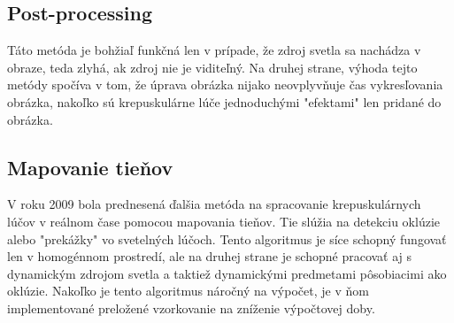 \documentclass[10pt,twoside,slovak,a4paper]{article}
\begin{document}
\subsection{Post-processing} \label{spracovanie:pp}
Táto metóda je bohžiaľ funkčná len v prípade, že zdroj svetla sa nachádza v obraze, 
teda zlyhá, ak zdroj nie je viditeľný. Na druhej strane, výhoda tejto metódy spočíva v 
tom, že úprava obrázka nijako neovplyvňuje čas vykresľovania obrázka, nakoľko sú 
krepuskulárne lúče jednoduchými "efektami" len pridané do obrázka.

\subsection{Mapovanie tieňov} \label{spracovanie:mt}
V roku 2009 bola prednesená ďalšia metóda na spracovanie krepuskulárnych lúčov v reálnom 
čase pomocou mapovania tieňov. Tie slúžia na detekciu oklúzie alebo "prekážky" vo svetelných 
lúčoch. Tento algoritmus je síce schopný fungovať len v homogénnom prostredí, ale na druhej 
strane je schopné pracovať aj s dynamickým zdrojom svetla a taktiež dynamickými predmetami 
pôsobiacimi ako oklúzie. Nakoľko je tento algoritmus náročný na výpočet, je v ňom 
implementované preložené vzorkovanie na zníženie výpočtovej doby.





\end{document}
